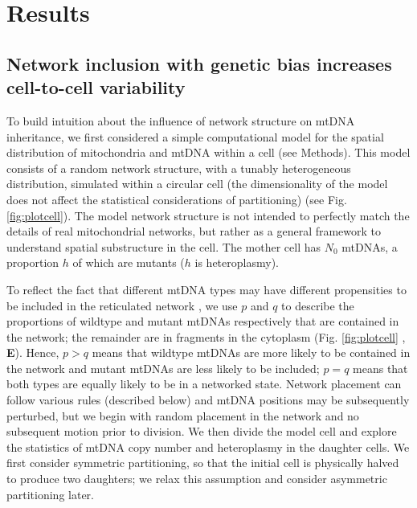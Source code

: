 \documentclass{article}
\begin{document}
\section{Results}
\subsection{Network inclusion with genetic bias increases cell-to-cell variability}
To build intuition about the influence of network structure on mtDNA inheritance, we first considered a simple computational model for the spatial distribution of mitochondria and mtDNA within a cell (see Methods). This model consists of a random network structure, with a tunably heterogeneous distribution, simulated within a circular cell (the dimensionality of the model does not affect the statistical considerations of partitioning) (see Fig. \ref{fig:plotcell}). The model network structure is not intended to perfectly match the details of real mitochondrial networks, but rather as a general framework to understand spatial substructure in the cell. The mother cell has $N_0$ mtDNAs, a proportion $h$ of which are mutants ($h$ is heteroplasmy). 

To reflect the fact that different mtDNA types may have different propensities to be included in the reticulated network \citep{twig2008fission}, we use $p$ and $q$ to describe the proportions of wildtype and mutant mtDNAs respectively that are contained in the network; the remainder are in fragments in the cytoplasm (Fig. \ref{fig:plotcell} , \textbf{E}). Hence, $p > q$ means that wildtype mtDNAs are more likely to be contained in the network and mutant mtDNAs are less likely to be included; $p=q$ means that both types are equally likely to be in a networked state. Network placement can follow various rules (described below) and mtDNA positions may be subsequently perturbed, but we begin with random placement in the network and no subsequent motion prior to division. We then divide the model cell and explore the statistics of mtDNA copy number and heteroplasmy in the daughter cells. We first consider symmetric partitioning, so that the initial cell is physically halved to produce two daughters; we relax this assumption and consider asymmetric partitioning later.
\end{document}
